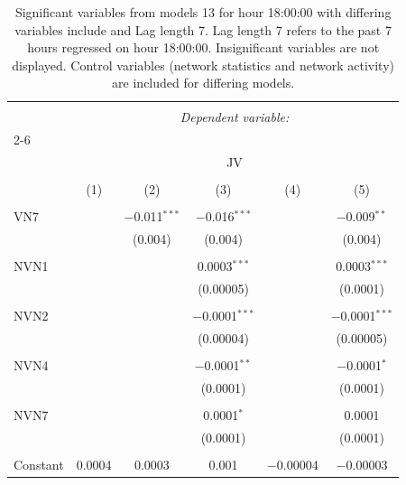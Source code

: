 
\begin{table}[!htbp] \centering 
  \caption{Significant variables from models 13 for hour 18:00:00 with differing variables include 
                               and Lag length 7. Lag length 7 refers to the past 7 hours regressed on hour 18:00:00. 
                               Insignificant variables are not displayed. 
                               Control variables (network statistics and network activity) are 
                               included for differing models.} 
  \label{Jmodels1_t_hourlagged5} 
\scriptsize 
\begin{tabular}{@{\extracolsep{5pt}}lccccc} 
\\[-1.8ex]\hline 
\hline \\[-1.8ex] 
 & \multicolumn{5}{c}{\textit{Dependent variable:}} \\ 
\cline{2-6} 
\\[-1.8ex] & \multicolumn{5}{c}{JV} \\ 
\\[-1.8ex] & (1) & (2) & (3) & (4) & (5)\\ 
\hline \\[-1.8ex] 
 VN7 &  & $-$0.011$^{***}$ & $-$0.016$^{***}$ &  & $-$0.009$^{**}$ \\ 
  &  & (0.004) & (0.004) &  & (0.004) \\ 
  & & & & & \\ 
 NVN1 &  &  & 0.0003$^{***}$ &  & 0.0003$^{***}$ \\ 
  &  &  & (0.00005) &  & (0.0001) \\ 
  & & & & & \\ 
 NVN2 &  &  & $-$0.0001$^{***}$ &  & $-$0.0001$^{***}$ \\ 
  &  &  & (0.00004) &  & (0.00005) \\ 
  & & & & & \\ 
 NVN4 &  &  & $-$0.0001$^{**}$ &  & $-$0.0001$^{*}$ \\ 
  &  &  & (0.0001) &  & (0.0001) \\ 
  & & & & & \\ 
 NVN7 &  &  & 0.0001$^{*}$ &  & 0.0001 \\ 
  &  &  & (0.0001) &  & (0.0001) \\ 
  & & & & & \\ 
 Constant & 0.0004 & 0.0003 & 0.001 & $-$0.00004 & $-$0.00003 \\ 

\end{tabular}
\end{table}

